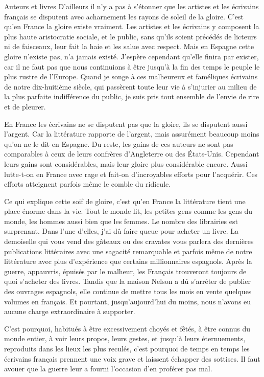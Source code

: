 \begin{chapter}{Auteurs et livres}
D'ailleurs il n'y a pas à s'étonner que les artistes et les écrivains
français se disputent avec acharnement les rayons de soleil de la
gloire. C'est qu'en France la gloire existe vraiment. Les artistes et
les écrivains y composent la plus haute aristocratie sociale, et le
public, sans qu'ils soient précédés de licteurs ni de faisceaux, leur
fait la haie et les salue avec respect. Mais en Espagne cette gloire
n'existe pas, n'a jamais existé. J'espère cependant qu'elle finira par
exister, car il ne faut pas que nous continuions à être jusqu'à la fin
des temps le peuple le plus rustre de l'Europe. Quand je songe à ces
malheureux et faméliques écrivains de notre dix-huitième siècle, qui
passèrent toute leur vie à s'injurier au milieu de la plus parfaite
indifférence du public, je suis pris tout ensemble de l'envie de rire et
de pleurer.

En France les écrivains ne se disputent pas que la gloire, ils se
disputent aussi l'argent. Car la littérature rapporte de l'argent, mais
assurément beaucoup moins qu'on ne le dit en Espagne. Du reste, les
gains de ces auteurs ne sont pas comparables à ceux de leurs confrères
d'Angleterre ou des États-Unis. Cependant leurs gains sont
considérables, mais leur gloire plus considérable encore. Aussi
lutte-t-on en France avec rage et fait-on d'incroyables efforts pour
l'acquérir. Ces efforts atteignent parfois même le comble du ridicule.

Ce qui explique cette soif de gloire, c'est qu'en France la littérature
tient une place énorme dans la vie. Tout le monde lit, les petites gens
comme les gens du monde, les hommes aussi bien que les femmes. Le nombre
des librairies est surprenant. Dans l'une d'elles, j'ai dû faire queue
pour acheter un livre. La demoiselle qui vous vend des gâteaux ou des
cravates vous parlera des dernières publications littéraires avec une
sagacité remarquable et parfois même de notre littérature avec plus
d'expérience que certains millionnaires espagnols. Après la guerre,
appauvris, épuisés par le malheur, les Français trouveront toujours de
quoi s'acheter des livres. Tandis que la maison Nelson a dû s'arrêter de
publier des ouvrages espagnols, elle continue de mettre tous les mois en
vente quelques volumes en français. Et pourtant, jusqu'aujourd'hui du
moins, nous n'avons eu aucune charge extraordinaire à supporter.

C'est pourquoi, habitués à être excessivement choyés et fêtés, à être
connus du monde entier, à voir leurs propos, leurs gestes, et jusqu'à
leurs éternuements, reproduits dans les lieux les plus reculés, c'est
pourquoi de temps en temps les écrivains français prennent une voix
grave et laissent échapper des sottises. Il faut avouer que la guerre
leur a fourni l'occasion d'en proférer pas mal.


\end{chapter}

